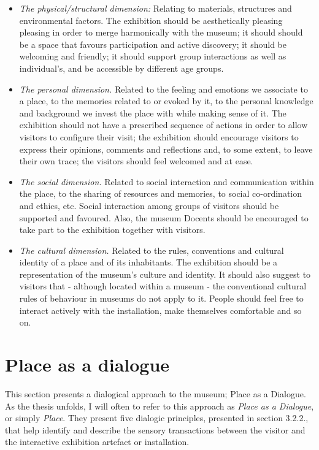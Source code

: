 \begin{itemize}
  \item \emph{The physical/structural dimension:} Relating to materials, structures and environmental factors. The exhibition should be aesthetically pleasing pleasing in order to merge harmonically with the museum; it should should be a space that favours participation and active discovery; it should be welcoming and friendly; it should support group interactions as well as individual's, and be accessible by different age groups.
  \item \emph{The personal dimension.} Related to the feeling and emotions we associate to a place, to the memories related to or evoked by it, to the personal knowledge and background we invest the place with while making sense of it. The exhibition should not have a prescribed sequence of actions in order to allow visitors to configure their visit; the exhibition should encourage visitors to express their opinions, comments and reflections and, to some extent, to leave their own trace; the visitors should feel welcomed and at ease. 
  \item \emph{The social dimension.} Related to social interaction and communication within the place, to the sharing of resources and memories, to social co-ordination and ethics, etc. Social interaction among groups of visitors should be supported and favoured. Also, the museum Docents should be encouraged to take part to the exhibition together with visitors.
  \item \emph{The cultural dimension.} Related to the rules, conventions and cultural identity of a place and of its inhabitants. The exhibition should be a representation of the museum's culture and identity. It should also suggest to visitors that - although located within a museum - the conventional cultural rules of behaviour in museums do not apply to it. People should feel free to interact actively with the installation, make themselves comfortable and so on.
\end{itemize}



\break
\section{Place as a dialogue}
This section presents a dialogical approach to the museum; Place as a Dialogue. As the thesis unfolds, I will often to refer to this approach as \emph{Place as a Dialogue}, or simply \emph{Place}. They present five dialogic principles, presented in section 3.2.2., that help identify and describe the sensory transactions between the visitor and the interactive exhibition artefact or installation.


